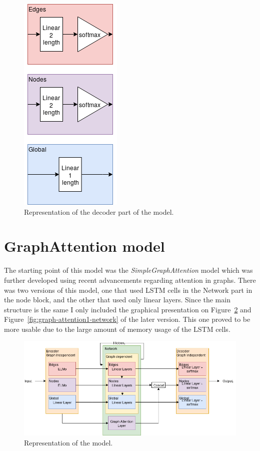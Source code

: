 \begin{figure}[!ht]
	\centering
	\includegraphics[scale=0.5]{figures/GA0_decoder.png}
	\caption{Representation of the decoder part of the model.}
	\label{fig:graph-attention0-decoder}
\end{figure}

\section{GraphAttention model}
The starting point of this model was the \textit{SimpleGraphAttention} model which was further developed using recent advancements regarding attention in graphs. There was two versions of this model, one that used LSTM cells in the Network part in the node block, and the other that used only linear layers. Since the main structure is the same I only included the graphical presentation on Figure~\ref{fig:graph-attention1} and Figure~\ref{fig:graph-attention1-network} of the later version. This one proved to be more usable due to the large amount of memory usage of the LSTM cells.

\begin{figure}[!ht]
	\centering
	\includegraphics[width=150mm, keepaspectratio]{figures/GA1.png}
	\caption{Representation of the model.}
	\label{fig:graph-attention1}
\end{figure}


